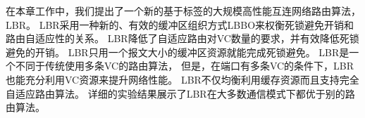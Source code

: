在本章工作中，我们提出了一个新的基于标签的大规模高性能互连网络路由算法，LBR。
LBR采用一种新的、有效的缓冲区组织方式LBBO来权衡死锁避免开销和路由自适应性的关系。
LBR降低了自适应路由对VC数量的要求，并有效降低死锁避免的开销。
LBR只用一个报文大小的缓冲区资源就能完成死锁避免。
LBR是一个不同于传统使用多条VC的路由算法，
但是，在端口有多条VC的条件下，LBR也能充分利用VC资源来提升网络性能。
LBR不仅均衡利用缓存资源而且支持完全自适应路由算法。
详细的实验结果展示了LBR在大多数通信模式下都优于别的路由算法。

\begin{comment}
  \subsection{缓冲区划分}

  在这一节中，我们比较了两种缓冲区划分策略：（1）Single策略：$VC_0$中存放
  红色报文的队列大小为1个报文大小。（2）Half策略：$VC_0$中存放红色报文的队列
  大小为$VC_0$缓冲区大小的一半。我们设置了两种全局端口缓冲区配置，一种是256个
  切片大小，一种是128切片大小。因此，我们有四种情况进行分析比较：

  \begin{figure}
    \centering
    \begin{minipage}[t]{\textwidth}
      \subfloat[Latency]{
        \texttt{[image: latencygrr1vcescape2vcblend.eps]}
        \label{latencygrr1vcescape2vcblend}
      }
      \subfloat[Routing Computation]{
        \texttt{[image: rcgrr1vcescape2vcblenddlf.eps]}
        \label{rcgrr1vcescape2vcblenddlf}
      }
      \subfloat[VC Utilization]{
        \texttt{[image: vcgrr1vcescape2vcblenddlf.eps]}
        \label{vcgrr1vcescape2vcblenddlf}
      }
      \caption{Buffer Partitioning under Blended Traffic Pattern}
      \label{fig:grr1escape2blend}
    \end{minipage}
  \end{figure}

  \begin{figure}
    \centering
    \begin{minipage}[t]{\textwidth}
      \subfloat[Latency]{
        \texttt{[image: latencyGRR2vc3vcblend.eps]}
        \label{latencyGRR2vc3vcblend}
      }
      \subfloat[GRR-2]{
        \texttt{[image: latencyGRRunad2vcrcblend.eps]}
        \label{latencyGRRunad2vcrcblend}
      }
      \subfloat[GRR-3]{
        \texttt{[image: latencyGRRunad3vcrc.eps]}
        \label{latencyGRRunad3vcrc}
      }
      \caption{VC Allocation Strategies under Blended Traffic Pattern}
      \label{fig:vcstrategies}
    \end{minipage}
  \end{figure}

\end{comment}
